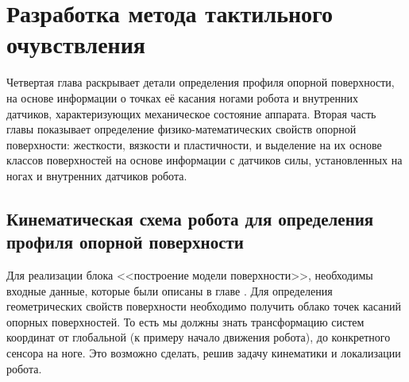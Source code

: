 \chapter{Разработка метода тактильного очувствления}\label{ch:ch4}

Четвертая глава раскрывает детали определения профиля опорной поверхности, на основе информации о точках её касания ногами робота и внутренних датчиков, характеризующих механическое состояние аппарата. Вторая часть главы показывает определение физико-математических свойств опорной поверхности: жесткости, вязкости и пластичности, и выделение на их основе классов поверхностей на основе информации с датчиков силы, установленных на ногах и внутренних датчиков робота.

\section{Кинематическая схема робота для определения профиля опорной поверхности}

Для реализации блока <<построение модели поверхности>>, необходимы входные данные, которые были  описаны в главе . Для определения геометрических свойств поверхности необходимо получить облако точек касаний опорных поверхностей. То есть мы должны знать трансформацию систем координат от глобальной (к примеру начало движения робота), до конкретного сенсора на ноге. Это возможно сделать, решив задачу кинематики и локализации робота.

